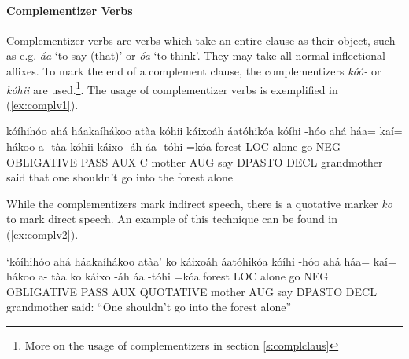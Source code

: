 \documentclass[a4paper, 12pt, oneside]{memoir}
\newcommand{\emh}[1]{\textit{#1}}
\begin{document}
\paragraph{Complementizer Verbs}
Complementizer verbs are verbs which take an entire clause as their object, such as e.g. \emh{áa} `to say (that)' or \emh{óa} `to think'. They may take all normal inflectional affixes. To mark the end of a complement clause, the complementizers \emh{kóó-} or \emh{kóhii} are used.\footnote{More on the usage of complementizers  in section \ref{s:complclaus}}. The usage of complementizer verbs is exemplified in (\ref{ex:complv1}).
\begin{examples}
    \ex \label{ex:complv1}
    \words kóíhihóo ahá háakaíhákoo atàa kóhii káixoáh áatóhikóa
    \bits kóíhi -hóo ahá háa= kaí= hákoo a- tàa kóhii káixo -áh áa -tóhi =kóa
    \gloss forest LOC alone go NEG OBLIGATIVE PASS AUX C mother AUG say DPASTO DECL
    \tr [My] grandmother said that one shouldn't go into the forest alone
\end{examples}
While the complementizers mark indirect speech, there is a quotative marker \emh{ko} to mark direct speech. An example of this technique can be found in (\ref{ex:complv2}).
\begin{examples}
    \ex \label{ex:complv2}
    \words `kóíhihóo ahá háakaíhákoo atàa' ko káixoáh áatóhikóa
    \bits kóíhi -hóo ahá háa= kaí= hákoo a- tàa ko  káixo -áh áa -tóhi =kóa
    \gloss forest LOC alone go NEG OBLIGATIVE PASS AUX QUOTATIVE mother AUG say DPASTO DECL
    \tr [My] grandmother said: ``One shouldn't go into the forest alone''
\end{examples}
\end{document}
